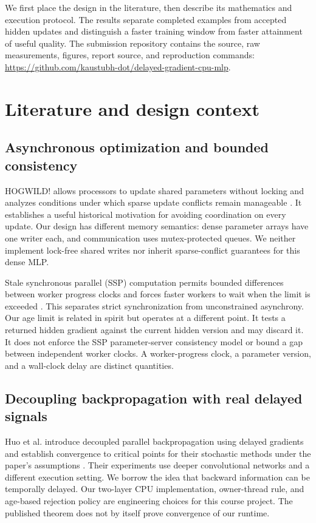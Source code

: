 \documentclass[conference]{IEEEtran}
\newcommand{\repo}{\url{https://github.com/kaustubh-dot/delayed-gradient-cpu-mlp}}
\begin{document}
We first place the design in the literature, then describe its mathematics and execution protocol. The results separate completed examples from accepted hidden updates and distinguish a faster training window from faster attainment of useful quality. The submission repository contains the source, raw measurements, figures, report source, and reproduction commands: \repo.

\section{Literature and design context}
\subsection{Asynchronous optimization and bounded consistency}
HOGWILD! allows processors to update shared parameters without locking and analyzes conditions under which sparse update conflicts remain manageable \cite{hogwild}. It establishes a useful historical motivation for avoiding coordination on every update. Our design has different memory semantics: dense parameter arrays have one writer each, and communication uses mutex-protected queues. We neither implement lock-free shared writes nor inherit sparse-conflict guarantees for this dense MLP.

Stale synchronous parallel (SSP) computation permits bounded differences between worker progress clocks and forces faster workers to wait when the limit is exceeded \cite{ssp}. This separates strict synchronization from unconstrained asynchrony. Our age limit is related in spirit but operates at a different point. It tests a returned hidden gradient against the current hidden version and may discard it. It does not enforce the SSP parameter-server consistency model or bound a gap between independent worker clocks. A worker-progress clock, a parameter version, and a wall-clock delay are distinct quantities.

\subsection{Decoupling backpropagation with real delayed signals}
Huo et al. introduce decoupled parallel backpropagation using delayed gradients and establish convergence to critical points for their stochastic methods under the paper's assumptions \cite{ddg}. Their experiments use deeper convolutional networks and a different execution setting. We borrow the idea that backward information can be temporally delayed. Our two-layer CPU implementation, owner-thread rule, and age-based rejection policy are engineering choices for this course project. The published theorem does not by itself prove convergence of our runtime.
\end{document}
